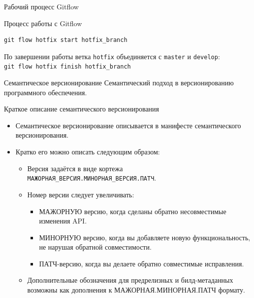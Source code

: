 \documentclass[
  ignorenonframetext,
  aspectratio=169,
  russian,
]{beamer}
\providecommand{\tightlist}{%
  \setlength{\itemsep}{0pt}\setlength{\parskip}{0pt}}
\begin{document}
\begin{frame}[fragile]{Рабочий процесс Gitflow}
\begin{block}{Процесс работы с Gitflow}
\begin{enumerate}[<+->]
\begin{itemize}[<+->]
\begin{enumerate}[<+->]
\begin{verbatim}
git flow hotfix start hotfix_branch
\end{verbatim}

      По завершении работы ветка \texttt{hotfix} объединяется с
      \texttt{master} и \texttt{develop}:
      \texttt{git\ flow\ hotfix\ finish\ hotfix\_branch}
    \end{enumerate}
  \end{itemize}
\end{enumerate}
\end{block}
\end{frame}

\begin{frame}[fragile]{Семантическое версионирование}
\protect{}\label{ux441ux435ux43cux430ux43dux442ux438ux447ux435ux441ux43aux43eux435-ux432ux435ux440ux441ux438ux43eux43dux438ux440ux43eux432ux430ux43dux438ux435}
Семантический подход в версионированию программного обеспечения.

\begin{block}{Краткое описание семантического версионирования}
\protect{}\label{ux43aux440ux430ux442ux43aux43eux435-ux43eux43fux438ux441ux430ux43dux438ux435-ux441ux435ux43cux430ux43dux442ux438ux447ux435ux441ux43aux43eux433ux43e-ux432ux435ux440ux441ux438ux43eux43dux438ux440ux43eux432ux430ux43dux438ux44f}
\begin{itemize}[<+->]
\item
  Семантическое версионирование описывается в манифесте семантического
  версионирования.
\item
  Кратко его можно описать следующим образом:

  \begin{itemize}[<+->]
  \tightlist
  \item
    Версия задаётся в виде кортежа
    \texttt{МАЖОРНАЯ\_ВЕРСИЯ.МИНОРНАЯ\_ВЕРСИЯ.ПАТЧ}.
  \item
    Номер версии следует увеличивать:

    \begin{itemize}[<+->]
    \tightlist
    \item
      МАЖОРНУЮ версию, когда сделаны обратно несовместимые изменения
      API.
    \item
      МИНОРНУЮ версию, когда вы добавляете новую функциональность, не
      нарушая обратной совместимости.
    \item
      ПАТЧ-версию, когда вы делаете обратно совместимые исправления.
    \end{itemize}
  \item
    Дополнительные обозначения для предрелизных и билд-метаданных
    возможны как дополнения к МАЖОРНАЯ.МИНОРНАЯ.ПАТЧ формату.
  \end{itemize}
\end{itemize}
\end{block}


\end{frame}
\end{document}
